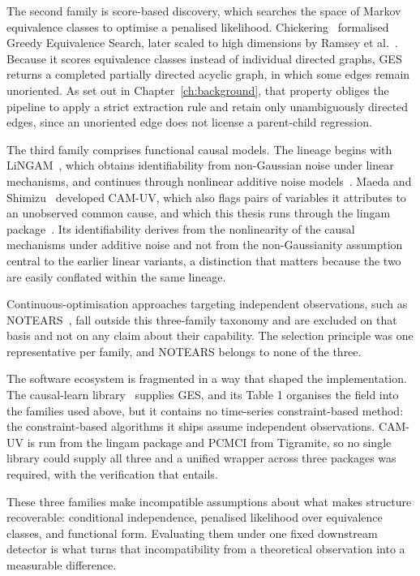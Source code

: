 The second family is score-based discovery, which searches the space of Markov equivalence classes to optimise a penalised likelihood. Chickering~\cite{chickering2002ges} formalised Greedy Equivalence Search, later scaled to high dimensions by Ramsey et al.~\cite{ramsey2017fges}. Because it scores equivalence classes instead of individual directed graphs, GES returns a completed partially directed acyclic graph, in which some edges remain unoriented. As set out in Chapter~\ref{ch:background}, that property obliges the pipeline to apply a strict extraction rule and retain only unambiguously directed edges, since an unoriented edge does not license a parent-child regression.

The third family comprises functional causal models. The lineage begins with LiNGAM~\cite{shimizu2006lingam}, which obtains identifiability from non-Gaussian noise under linear mechanisms, and continues through nonlinear additive noise models~\cite{hoyer2008anm,buhlmann2014cam}. Maeda and Shimizu~\cite{maeda2021camuv} developed CAM-UV, which also flags pairs of variables it attributes to an unobserved common cause, and which this thesis runs through the lingam package~\cite{ikeuchi2023lingam}. Its identifiability derives from the nonlinearity of the causal mechanisms under additive noise and not from the non-Gaussianity assumption central to the earlier linear variants, a distinction that matters because the two are easily conflated within the same lineage.

Continuous-optimisation approaches targeting independent observations, such as NOTEARS~\cite{zheng2018notears}, fall outside this three-family taxonomy and are excluded on that basis and not on any claim about their capability. The selection principle was one representative per family, and NOTEARS belongs to none of the three.

The software ecosystem is fragmented in a way that shaped the implementation. The causal-learn library~\cite{zheng2024causallearn} supplies GES, and its Table 1 organises the field into the families used above, but it contains no time-series constraint-based method: the constraint-based algorithms it ships assume independent observations. CAM-UV is run from the lingam package and PCMCI from Tigramite, so no single library could supply all three and a unified wrapper across three packages was required, with the verification that entails.

These three families make incompatible assumptions about what makes structure recoverable: conditional independence, penalised likelihood over equivalence classes, and functional form. Evaluating them under one fixed downstream detector is what turns that incompatibility from a theoretical observation into a measurable difference.

